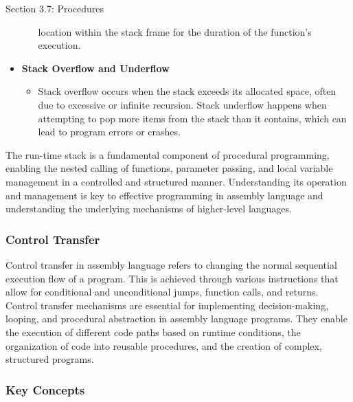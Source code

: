 \begin{notes}{Section 3.7: Procedures}
\begin{itemize}
\begin{itemize}
            location within the stack frame for the duration of the function's execution.
        \end{itemize}
        \item \textbf{Stack Overflow and Underflow}
        \begin{itemize}
            \item Stack overflow occurs when the stack exceeds its allocated space, often due to excessive or infinite recursion. Stack underflow happens when attempting to pop more items from the 
            stack than it contains, which can lead to program errors or crashes.
        \end{itemize}
    \end{itemize}
    
    The run-time stack is a fundamental component of procedural programming, enabling the nested calling of functions, parameter passing, and local variable management in a controlled and structured 
    manner. Understanding its operation and management is key to effective programming in assembly language and understanding the underlying mechanisms of higher-level languages.

    \subsubsection*{Control Transfer}

    Control transfer in assembly language refers to changing the normal sequential execution flow of a program. This is achieved through various instructions that allow for conditional and unconditional 
    jumps, function calls, and returns. Control transfer mechanisms are essential for implementing decision-making, looping, and procedural abstraction in assembly language programs. They enable the 
    execution of different code paths based on runtime conditions, the organization of code into reusable procedures, and the creation of complex, structured programs.
    
    \subsubsection*{Key Concepts}
    

\end{notes}
